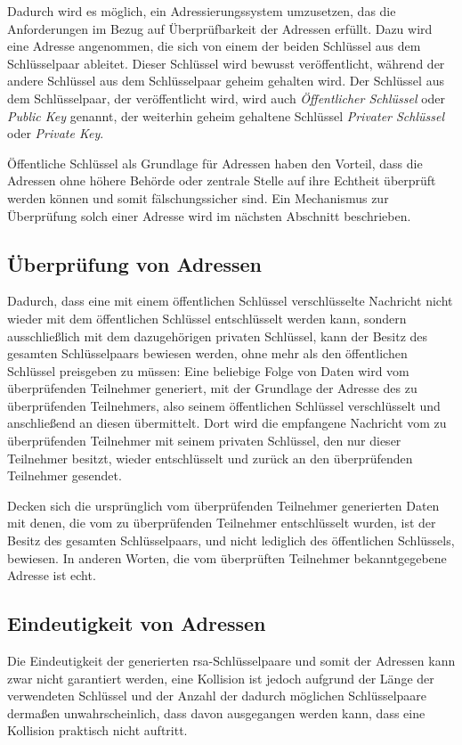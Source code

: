 Dadurch wird es möglich, ein Adressierungssystem umzusetzen, das die Anforderungen im Bezug auf
Überprüfbarkeit der Adressen erfüllt. Dazu wird eine Adresse angenommen, die sich von einem der
beiden Schlüssel aus dem Schlüsselpaar ableitet. Dieser Schlüssel wird bewusst veröffentlicht,
während der andere Schlüssel aus dem Schlüsselpaar geheim gehalten wird.
Der Schlüssel aus dem Schlüsselpaar, der veröffentlicht wird, wird auch \emph{Öffentlicher Schlüssel}
oder \emph{Public Key} genannt, der weiterhin geheim gehaltene Schlüssel \emph{Privater Schlüssel} oder
\emph{Private Key}.

Öffentliche Schlüssel als Grundlage für Adressen haben den Vorteil, dass die Adressen ohne höhere
Behörde oder zentrale Stelle auf ihre Echtheit überprüft werden können und somit fälschungssicher sind.
Ein Mechanismus zur Überprüfung solch einer Adresse wird im nächsten Abschnitt beschrieben.

\subsection{Überprüfung von Adressen}
\label{dcl-addr-proving}
Dadurch, dass eine mit einem öffentlichen Schlüssel verschlüsselte Nachricht nicht wieder mit dem
öffentlichen Schlüssel entschlüsselt werden kann, sondern ausschließlich mit dem dazugehörigen privaten
Schlüssel, kann der Besitz des gesamten Schlüsselpaars bewiesen werden, ohne mehr als den öffentlichen
Schlüssel preisgeben zu müssen: Eine beliebige Folge von Daten wird vom überprüfenden Teilnehmer
generiert, mit der Grundlage der Adresse des zu überprüfenden Teilnehmers, also seinem öffentlichen
Schlüssel verschlüsselt und anschließend an diesen übermittelt. Dort wird die empfangene Nachricht vom zu
überprüfenden Teilnehmer mit seinem privaten Schlüssel, den nur dieser Teilnehmer besitzt, wieder
entschlüsselt und zurück an den überprüfenden Teilnehmer gesendet.

Decken sich die ursprünglich vom überprüfenden Teilnehmer generierten Daten mit denen, die vom zu
überprüfenden Teilnehmer entschlüsselt wurden, ist der Besitz des gesamten Schlüsselpaars, und nicht
lediglich des öffentlichen Schlüssels, bewiesen. In anderen Worten, die vom überprüften Teilnehmer
bekanntgegebene Adresse ist echt.



\subsection{Eindeutigkeit von Adressen}
\label{dcl-addr-uniqueness}
Die Eindeutigkeit der generierten \gls{rsa}-Schlüsselpaare und somit der Adressen kann zwar nicht
garantiert werden, eine Kollision ist jedoch aufgrund der Länge der verwendeten Schlüssel und der
Anzahl der dadurch möglichen Schlüsselpaare dermaßen unwahrscheinlich, dass davon ausgegangen
werden kann, dass eine Kollision praktisch nicht auftritt. \cite{crypto.stackexchange.com/a/2559:rsa-key-collision}

